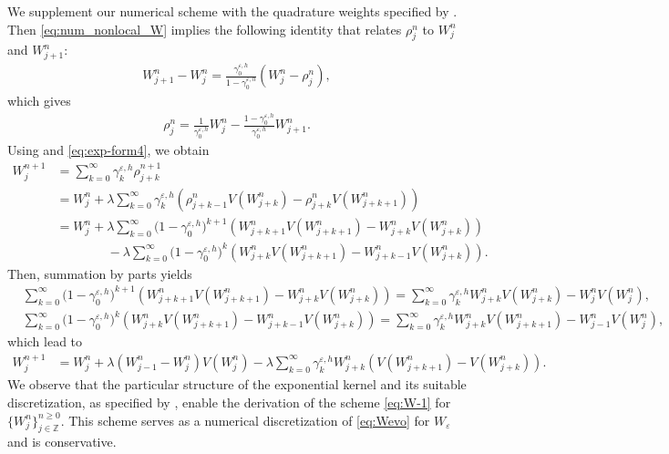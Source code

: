 \documentclass[10pt]{amsart}
\theoremstyle{plain}
\theoremstyle{definition}
\numberwithin{equation}{section}
\newcommand{\eps}{{\varepsilon}}
\begin{document}
We supplement our numerical scheme  with the quadrature weights specified by .
Then \cref{eq:num_nonlocal_W} implies the following identity that relates $\rho_j^n$ to $W_j^n$ and $W_{j+1}^n$:
\begin{align} \label{eq:exp-form3}
    W_{j+1}^n - W_j^n = \frac{\gamma_0^{\eps,h}}{1-\gamma_0^{\eps,h}} (W_j^n-\rho_j^n),
\end{align}
which gives
\begin{align}\label{eq:exp-form4}
    \rho_j^n = \frac1{\gamma_0^{\eps,h}}W_j^n - \frac{1-\gamma_0^{\eps,h}}{\gamma_0^{\eps,h}}W_{j+1}^n.
\end{align}
Using  and \cref{eq:exp-form4}, we obtain  
\begin{align*}
    W_j^{n+1} &= \sum_{k=0}^\infty \gamma_k^{\eps,h} \rho_{j+k}^{n+1} \\
    &= W_j^n + \lambda \sum_{k=0}^\infty \gamma_k^{\eps,h} \left( \rho_{j+k-1}^n V(W_{j+k}^n) -\rho_{j+k}^n V(W_{j+k+1}^n) \right) \\
    &= W_j^n + \lambda \sum_{k=0}^\infty \big(1-\gamma_0^{\eps,h}\big)^{k+1} \left( W_{j+k+1}^n V(W_{j+k+1}^n) - W_{j+k}^n V(W_{j+k}^n) \right) \\
    &\qquad\qquad - \lambda \sum_{k=0}^\infty \big(1-\gamma_0^{\eps,h}\big)^k \left( W_{j+k}^n V(W_{j+k+1}^n) - W_{j+k-1}^n V(W_{j+k}^n) \right).
\end{align*}
Then, summation by parts yields
\begin{align*}
    &\sum_{k=0}^\infty \!\big(1-\gamma_0^{\eps,h}\big)^{k+1} \!\left( W_{j+k+1}^n V(W_{j+k+1}^n) - W_{j+k}^n V(W_{j+k}^n) \right) = \sum_{k=0}^\infty \gamma_k^{\eps,h} W_{j+k}^n V(W_{j+k}^n) - W_j^n V(W_j^n), \\
    &\sum_{k=0}^\infty \!\big(1-\gamma_0^{\eps,h}\big)^k \!\left( W_{j+k}^n V(W_{j+k+1}^n) - W_{j+k-1}^n V(W_{j+k}^n) \right) = \sum_{k=0}^\infty \gamma_k^{\eps,h} W_{j+k}^n V(W_{j+k+1}^n) - W_{j-1}^nV(W_j^n),
\end{align*}
which lead to
\begin{align}\label{eq:W-1}
 W_j^{n+1} &= W_j^n + \lambda \left( W_{j-1}^n - W_j^n \right) V(W_j^n)  - \lambda \sum_{k=0}^\infty \gamma_k^{\eps,h}  W_{j+k}^n \left( V(W_{j+k+1}^n) - V(W_{j+k}^n) \right).
\end{align}
We observe that the particular structure of the exponential kernel and its suitable discretization, as specified by , enable the derivation of the scheme \cref{eq:W-1} for $\{W_j^n\}_{j\in\mathbb{Z}}^{n\geq0}$. This scheme serves as a numerical discretization of \cref{eq:Wevo} for $W_\varepsilon$ and is conservative.
\end{document}
